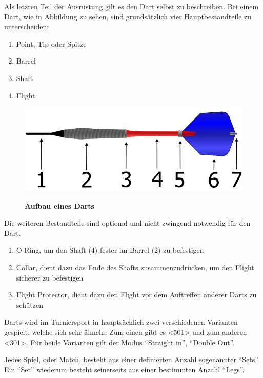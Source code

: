 Als letzten Teil der Ausrüstung gilt es den Dart selbst zu beschreiben. Bei einem Dart, wie in Abbildung  zu sehen, sind grundsätzlich vier Hauptbestandteile zu unterscheiden:
\begin{enumerate}
    \item Point, Tip oder Spitze
    \item Barrel
    \addtocounter{enumi}{1}
    \item Shaft
    \addtocounter{enumi}{1}
    \item Flight
\end{enumerate}
\begin{figure}
\includegraphics[width=\textwidth]{media/Dart}\\
\caption{\textbf{Aufbau eines Darts\cite{dart2006}}
}
\label{Fig:darts}
\end{figure}
Die weiteren Bestandteile sind optional und nicht zwingend notwendig für den Dart. 
\begin{enumerate}
	\addtocounter{enumi}{1}
	\addtocounter{enumi}{1}
    \item O-Ring, um den Shaft (4) fester im Barrel (2) zu befestigen
    \addtocounter{enumi}{1}
    \item Collar, dient dazu das Ende des Shafts zusammenzudrücken, um den Flight sicherer zu befestigen
    \addtocounter{enumi}{1}
    \item Flight Protector, dient dazu den Flight vor dem Auftreffen anderer Darts zu schützen

\end{enumerate}

Darts wird im Turniersport in hauptsächlich zwei verschiedenen Varianten gespielt, welche sich sehr ähneln. Zum einen gibt es <501> und zum anderen <301>. Für beide Varianten gilt der Modus "`Straight in"', "`Double Out"'.

Jedes Spiel, oder Match, besteht aus einer definierten Anzahl sogenannter "`Sets"'. Ein "`Set"' wiederum besteht seinerseits aus einer bestimmten Anzahl "`Legs"'.

